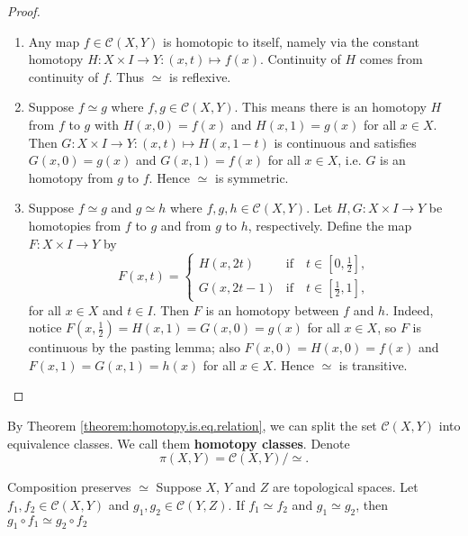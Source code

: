 \begin{proof}
\begin{enumerate}[label=(\roman*)] 
    \item Any map \(f\in \mathcal{C}(X,Y)\) is homotopic to itself, namely via the constant homotopy \(H\colon X\times I \to Y: (x,t)\mapsto f(x)\). Continuity of \(H\) comes from continuity of \(f\). Thus \(\simeq\) is reflexive.
    \item  Suppose \(f\simeq g\) where \(f,g\in \mathcal{C}(X,Y)\). This means  there is an homotopy \(H\) from \(f\) to \(g\) with \(H(x,0) =  f(x)\) and \(H(x,1) =  g(x)\) for all \(x\in X\). Then \(G\colon X\times I \to Y: (x,t)\mapsto H(x,1-t)\) is continuous  and satisfies \(G(x,0) = g(x)\) and \(G(x,1) = f(x)\) for all \(x\in X\), i.e. \(G\) is an homotopy from \(g\) to \(f\). Hence \(\simeq\) is symmetric.
    \item Suppose \(f\simeq g\) and \(g\simeq h\) where \(f,g,h\in \mathcal{C}(X,Y)\). Let \(H,G\colon X\times I\to Y\) be homotopies from \(f\) to \(g\) and from \(g\) to \(h\), respectively. Define the map \(F\colon X\times I \to  Y\) by \[
        F(x,t) = \begin{cases}
            H(x,2t)     & \text{if}\quad t\in [0,\frac{1}{2}],\\
            G(x,2t -1)  & \text{if}\quad t\in [\frac{1}{2},1],
        \end{cases}
    \] for all \(x\in X\) and \(t\in I\). Then \(F\) is an homotopy between \(f\) and \(h\). Indeed, notice \(F(x,\frac{1}{2})= H(x,1)=G(x,0)=g(x)\) for all \(x\in X\), so  \(F\) is continuous by the pasting lemma; also \(F(x,0) = H(x,0)= f(x)\) and \(F(x,1) =G(x,1)= h(x)\) for all \(x\in X\). Hence \(\simeq\) is transitive.
\end{enumerate}
\end{proof}


By Theorem \ref{theorem:homotopy.is.eq.relation}, we can split the set  \(\mathcal{C}(X,Y)\) into equivalence classes. We call them \textbf{homotopy classes}. Denote  \[\pi(X,Y) = \mathcal{C}(X,Y) / \simeq.\] 

\begin{theorem}{Composition preserves \(\simeq\)}{}
    Suppose \(X\), \(Y\) and \(Z\) are topological spaces. Let 
     \(f_1, f_2 \in \mathcal{C}(X,Y)\) and \(g_1, g_2 \in \mathcal{C}(Y, Z)\). If \(f_1 \simeq f_2\) and \(g_1 \simeq g_2\), then \(g_1 \circ f_1 \simeq g_2\circ f_2\)
\end{theorem}

